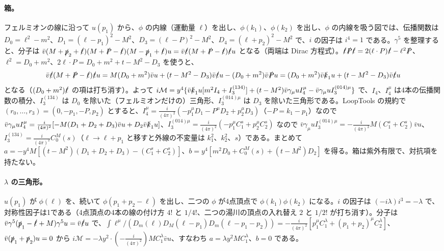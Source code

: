 \documentclass[a4paper,10pt]{ltjsarticle}
\begin{document}
\paragraph{箱。}フェルミオンの線に沿って $u(p_1)$ から、$\phi$ の内線（運動量 $\ell$）を出し、$\phi(k_1)$、$\phi(k_2)$ を出し、$\phi$ の内線を吸う図では、伝播関数は $D_0=\ell^2-m^2$、$D_1=(\ell-p_1)^2-M^2$、$D_3=(\ell-P)^2-M^2$、$D_4=(\ell+p_2)^2-M^2$ で、$i$ の因子は $i^4=1$ である。$\gamma^5$ を整理すると、分子は $\bar v(M+\slashed p_2+\slashed\ell)(M+\slashed P-\slashed\ell)(M-\slashed p_1+\slashed\ell)u=\bar v\slashed\ell(M+\slashed P-\slashed\ell)\slashed\ell u$ となる（両端は Dirac 方程式）。$\slashed\ell\slashed P\slashed\ell=2(\ell\cdot P)\slashed\ell-\ell^2\slashed P$、$\ell^2=D_0+m^2$、$2\ell\cdot P=D_0+m^2+t-M^2-D_3$ を使うと、
\begin{equation*}
\bar v\slashed\ell(M+\slashed P-\slashed\ell)\slashed\ell u=M(D_0+m^2)\bar vu+(t-M^2-D_3)\bar v\slashed\ell u-(D_0+m^2)\bar v\slashed Pu=(D_0+m^2)\bar v\slashed k_1u+(t-M^2-D_3)\bar v\slashed\ell u
\end{equation*}
となる（$(D_0+m^2)\slashed\ell$ の項は打ち消す）。よって $i\mathcal M=y^4\{\bar v\slashed k_1u[m^2I_4+I_3^{(134)}]+(t-M^2)\bar v\gamma_\mu uI_4^\mu-\bar v\gamma_\mu uI_3^{(014)\mu}\}$ で、$I_4$、$I_4^\mu$ は4本の伝播関数の積分、$I_3^{(134)}$ は $D_0$ を除いた（フェルミオンだけの）三角形、$I_3^{(014)\mu}$ は $D_3$ を除いた三角形である。LoopTools の規約で $(r_0,\dots,r_3)=(0,-p_1,-P,p_2)$ とすると、$I_4^\mu=\frac{i}{(4\pi)^2}(-p_1^\mu D_1-P^\mu D_2+p_2^\mu D_3)$（$-P=k_1-p_1$）なので $\bar v\gamma_\mu uI_4^\mu=\frac{i}{(4\pi)^2}[-M(D_1+D_2+D_3)\bar vu+D_2\bar v\slashed k_1u]$、$I_3^{(014)\mu}=\frac{i}{(4\pi)^2}(-p_1^\mu C^s_1+p_2^\mu C^s_2)$ なので $\bar v\gamma_\mu uI_3^{(014)\mu}=-\frac{i}{(4\pi)^2}M(C^s_1+C^s_2)\bar vu$、$I_3^{(134)}=\frac{i}{(4\pi)^2}C_0^M(s)$（$\ell\to\ell+p_1$ と移すと外線の不変量は $k_1^2$、$k_2^2$、$s$）である。まとめて $a=-y^4M[(t-M^2)(D_1+D_2+D_3)-(C^s_1+C^s_2)]$、$b=y^4[m^2D_0+C_0^M(s)+(t-M^2)D_2]$ を得る。箱は紫外有限で、対抗項を持たない。

\paragraph{$\lambda$ の三角形。}$u(p_1)$ が $\phi(\ell)$ を、続いて $\phi(p_1+p_2-\ell)$ を出し、二つの $\phi$ が4点頂点で $\phi(k_1)\phi(k_2)$ になる。$i$ の因子は $(-i\lambda)i^3=-\lambda$ で、対称性因子は1である（4点頂点の4本の線の付け方 $4!$ と $1/4!$、二つの湯川の頂点の入れ替え $2$ と $1/2!$ が打ち消す）。分子は $\bar v\gamma^5(\slashed p_1-\slashed\ell+M)\gamma^5u=\bar v\slashed\ell u$ で、$\int\ell^\mu/(D_m(\ell)D_M(\ell-p_1)D_m(\ell-p_1-p_2))=-\frac{i}{(4\pi)^2}[p_1^\mu C^\lambda_1+(p_1+p_2)^\mu C^\lambda_2]$、$\bar v(\slashed p_1+\slashed p_2)u=0$ から $i\mathcal M=-\lambda y^2\cdot(-\frac{i}{(4\pi)^2})MC^\lambda_1\bar vu$、すなわち $a=\lambda y^2MC^\lambda_1$、$b=0$ である。
\end{document}
